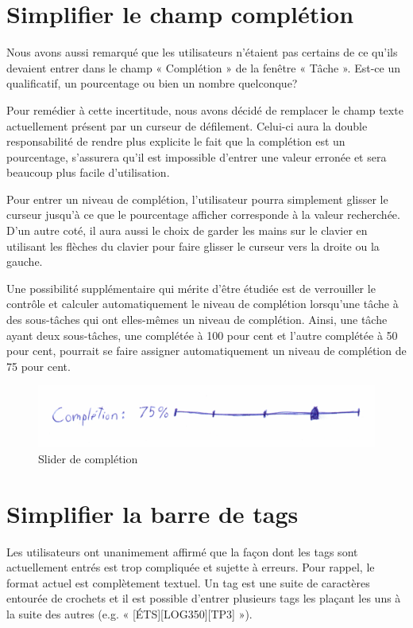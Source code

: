 \documentclass[letterpaper, oneside, 12pt, these, creativecommons]{thETS}
\begin{document}
\section{Simplifier le champ complétion}

Nous avons aussi remarqué que les utilisateurs n'étaient pas certains de ce qu'ils devaient entrer dans le champ « Complétion » de la fenêtre « Tâche ». Est-ce un qualificatif, un pourcentage ou bien un nombre quelconque?

Pour remédier à cette incertitude, nous avons décidé de remplacer le champ texte actuellement présent par un curseur de défilement. Celui-ci aura la double responsabilité de rendre plus explicite le fait que la complétion est un pourcentage, s'assurera qu'il est impossible d'entrer une valeur erronée et sera beaucoup plus facile d'utilisation.

Pour entrer un niveau de complétion, l'utilisateur pourra simplement glisser le curseur jusqu'à ce que le pourcentage afficher corresponde à la valeur recherchée. D'un autre coté, il aura aussi le choix de garder les mains sur le clavier en utilisant les flèches du clavier pour faire glisser le curseur vers la droite ou la gauche.

Une possibilité supplémentaire qui mérite d'être étudiée est de verrouiller le contrôle et calculer automatiquement le niveau de complétion lorsqu'une tâche à des sous-tâches qui ont elles-mêmes un niveau de complétion. Ainsi, une tâche ayant deux sous-tâches, une complétée à 100 pour cent et l'autre complétée à 50 pour cent, pourrait se faire assigner automatiquement un niveau de complétion de 75 pour cent.

\begin{figure}
    \includegraphics[scale=0.25]{completion2.png}
    \caption{Slider de complétion}
\end{figure}

\section{Simplifier la barre de tags}

Les utilisateurs ont unanimement affirmé que la façon dont les tags sont actuellement entrés est trop compliquée et sujette à erreurs. Pour rappel, le format actuel est complètement textuel. Un tag est une suite de caractères entourée de crochets et il est possible d'entrer plusieurs tags les plaçant les uns à la suite des autres (e.g. « [ÉTS][LOG350][TP3] »).
\end{document}

